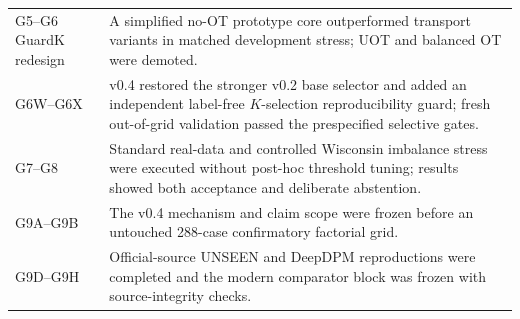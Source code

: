 \begin{table}[h]
\begin{tabularx}{\textwidth}{lX}
G5--G6 GuardK redesign & A simplified no-OT prototype core outperformed transport variants in matched development stress; UOT and balanced OT were demoted. \\
G6W--G6X & v0.4 restored the stronger v0.2 base selector and added an independent label-free $K$-selection reproducibility guard; fresh out-of-grid validation passed the prespecified selective gates. \\
G7--G8 & Standard real-data and controlled Wisconsin imbalance stress were executed without post-hoc threshold tuning; results showed both acceptance and deliberate abstention. \\
G9A--G9B & The v0.4 mechanism and claim scope were frozen before an untouched 288-case confirmatory factorial grid. \\
G9D--G9H & Official-source UNSEEN and DeepDPM reproductions were completed and the modern comparator block was frozen with source-integrity checks. \\
\bottomrule
\end{tabularx}
\end{table}
